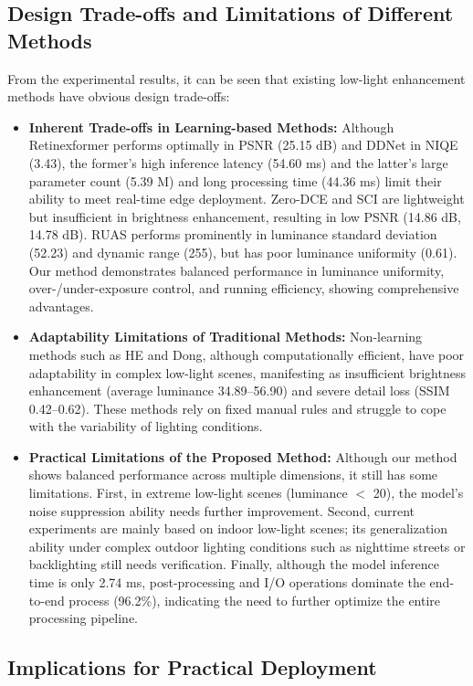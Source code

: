 \documentclass[sensors,article,submit,moreauthors]{Definitions/mdpi}
\begin{document}
\subsection{Design Trade-offs and Limitations of Different Methods}

From the experimental results, it can be seen that existing low-light enhancement methods have obvious design trade-offs:

\begin{itemize}
\item \textbf{Inherent Trade-offs in Learning-based Methods:} Although Retinexformer performs optimally in PSNR (25.15 dB) and DDNet in NIQE (3.43), the former's high inference latency (54.60 ms) and the latter's large parameter count (5.39 M) and long processing time (44.36 ms) limit their ability to meet real-time edge deployment. Zero-DCE and SCI are lightweight but insufficient in brightness enhancement, resulting in low PSNR (14.86 dB, 14.78 dB). RUAS performs prominently in luminance standard deviation (52.23) and dynamic range (255), but has poor luminance uniformity (0.61). Our method demonstrates balanced performance in luminance uniformity, over-/under-exposure control, and running efficiency, showing comprehensive advantages.
\item \textbf{Adaptability Limitations of Traditional Methods:} Non-learning methods such as HE and Dong, although computationally efficient, have poor adaptability in complex low-light scenes, manifesting as insufficient brightness enhancement (average luminance 34.89--56.90) and severe detail loss (SSIM 0.42--0.62). These methods rely on fixed manual rules and struggle to cope with the variability of lighting conditions.
\item \textbf{Practical Limitations of the Proposed Method:} Although our method shows balanced performance across multiple dimensions, it still has some limitations. First, in extreme low-light scenes (luminance $<$ 20), the model's noise suppression ability needs further improvement. Second, current experiments are mainly based on indoor low-light scenes; its generalization ability under complex outdoor lighting conditions such as nighttime streets or backlighting still needs verification. Finally, although the model inference time is only 2.74 ms, post-processing and I/O operations dominate the end-to-end process (96.2\%), indicating the need to further optimize the entire processing pipeline.
\end{itemize}

\subsection{Implications for Practical Deployment}
\end{document}
